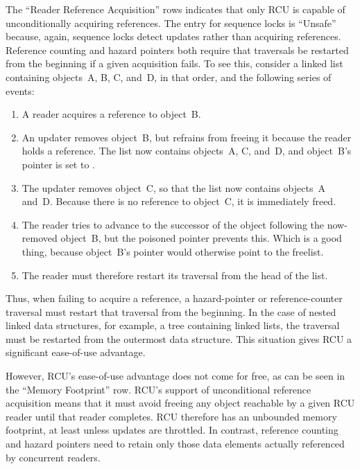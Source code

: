 The ``Reader Reference Acquisition'' rows indicates that only RCU is
capable of unconditionally acquiring references.
The entry for sequence locks is ``Unsafe'' because, again, sequence locks
detect updates rather than acquiring references.
Reference counting and hazard pointers both require that traversals be
restarted from the beginning if a given acquisition fails.
To see this, consider a linked list containing objects~A, B, C, and~D,
in that order, and the following series of events:

\begin{enumerate}
\item	A reader acquires a reference to object~B.
\item	An updater removes object~B, but refrains from freeing it because
	the reader holds a reference.
	The list now contains objects~A, C, and~D, and
	object~B's  pointer is set to .
\item	The updater removes object~C, so that the list now contains
	objects~A and~D\@.
	Because there is no reference to object~C, it is immediately freed.
\item	The reader tries to advance to the successor of the object
	following the now-removed object~B, but the poisoned
	 pointer prevents this.
	Which is a good thing, because object~B's  pointer
	would otherwise point to the freelist.
\item	The reader must therefore restart its traversal from the head
	of the list.
\end{enumerate}

Thus, when failing to acquire a reference, a hazard-pointer or
reference-counter traversal must restart that traversal from the
beginning.
In the case of nested linked data structures, for example, a
tree containing linked lists, the traversal must be restarted from
the outermost data structure.
This situation gives RCU a significant ease-of-use advantage.

However, RCU's ease-of-use advantage does not come
for free, as can be seen in the ``Memory Footprint'' row.
RCU's support of unconditional reference acquisition means that
it must avoid freeing any object reachable by a given
RCU reader until that reader completes.
RCU therefore has an unbounded memory footprint, at least unless updates
are throttled.
In contrast, reference counting and hazard pointers need to retain only
those data elements actually referenced by concurrent readers.

